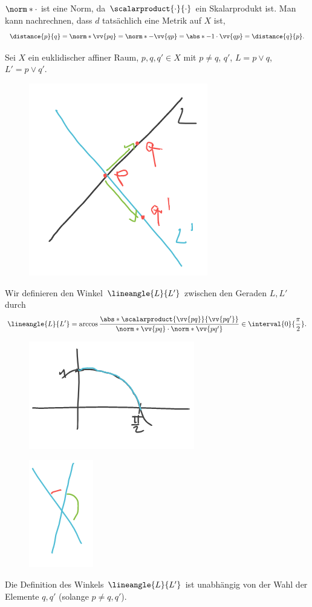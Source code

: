 \begin{bemerkung*}
  \( \norm*{\cdot} \) ist eine Norm, da \( \scalarproduct{\cdot}{\cdot} \) ein Skalarprodukt ist. Man kann nachrechnen, dass \( d \) tatsächlich eine Metrik auf \( X \) ist, \zb
  \begin{equation*}
    \distance{p}{q}=\norm*{\vv{pq}}=\norm*{-\vv{qp}}=\abs*{-1}\cdot\vv{qp}=\distance{q}{p}.
  \end{equation*}
\end{bemerkung*}
\begin{definition*}
  Sei \( X \) ein euklidischer affiner Raum, \( p,q,q'\in X \) mit \( p\neq q \), \( q' \), \( L=p\vee q \), \( L'=p\vee q' \).
  \begin{figure}[H]
    \centering
    \includegraphics[width=0.5\linewidth]{figures/affiner_winkel_definition}
    \label{fig:affiner_winkel_definition}
  \end{figure}
  Wir definieren den Winkel \( \lineangle{L}{L'} \) zwischen den Geraden \( L,L' \) durch
  \begin{equation*}
    \lineangle{L}{L'}=\arccos \frac{\abs*{\scalarproduct{\vv{pq}}{\vv{pq'}}}}{\norm*{\vv{pq}}\cdot\norm*{\vv{pq'}}}\in \interval{0}{\frac{\pi}{2}}.
  \end{equation*}
  \begin{figure}[H]
    \centering
    \includegraphics[width=0.3\linewidth]{figures/affiner_winkel_definition_wertebereich}
    \label{fig:affiner_winkel_definition_wertebereich}
  \end{figure}
  \begin{figure}[H]
    \centering
    \includegraphics[width=0.1\linewidth]{figures/affiner_winkel_definition_wertebereich_beispiel}
    \label{fig:affiner_winkel_definition_wertebereich_beispiel}
  \end{figure}
\end{definition*}
\begin{bemerkung*}
  Die Definition des Winkels \( \lineangle{L}{L'} \) ist unabhängig von der Wahl der Elemente \( q,q' \) (solange \( p\neq q,q' \)).
\end{bemerkung*}